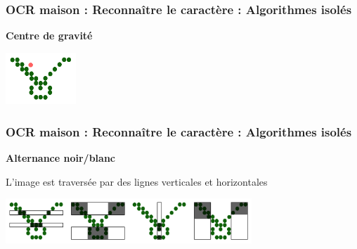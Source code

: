 \documentclass[xcolor=dvipsnames]{beamer}
\begin{document}
\begin{frame}
  \frametitle{OCR maison : Reconnaître le caractère : Algorithmes isolés}

  \begin{center}\begin{alertblock}{}
    \begin{center}\textbf{\Large Centre de gravité}\end{center}
  \end{alertblock}\end{center}

  \begin{center}
    \includegraphics[width=100px]{chmoll-gravity.png}
    
  \end{center}

\end{frame}


\begin{frame}
  \frametitle{OCR maison : Reconnaître le caractère : Algorithmes isolés}

  \begin{center}\begin{alertblock}{}
    \begin{center}\textbf{\Large Alternance noir/blanc}\end{center}
  \end{alertblock}\end{center}

  \begin{center}
    L'image est traversée par des lignes verticales et horizontales
   
	\includegraphics[width=350px]{chmoll-alternation.png}
  \end{center}
  
\end{frame}
\end{document}
